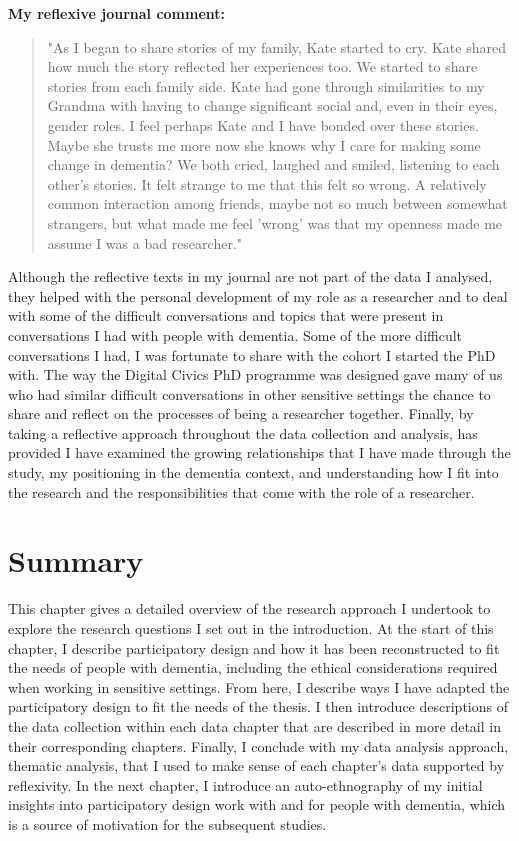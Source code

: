 \textbf{My reflexive journal comment: 
}
\begin{quote}
"As I began to share stories of my family, Kate started to cry. Kate shared how much the story reflected her experiences too. We started to share stories from each family side. Kate had gone through similarities to my Grandma with having to change significant social and, even in their eyes, gender roles. I feel perhaps Kate and I have bonded over these stories. Maybe she trusts me more now she knows why I care for making some change in dementia? We both cried, laughed and smiled, listening to each other's stories. It felt strange to me that this felt so wrong. A relatively common interaction among friends, maybe not so much between somewhat strangers, but what made me feel 'wrong' was that my openness made me assume I was a bad researcher."
\end{quote}

Although the reflective texts in my journal are not part of the data I analysed, they helped with the personal development of my role as a researcher and to deal with some of the difficult conversations and topics that were present in conversations I had with people with dementia. Some of the more difficult conversations I had, I was fortunate to share with the cohort I started the PhD with. The way the Digital Civics PhD programme was designed gave many of us who had similar difficult conversations in other sensitive settings the chance to share and reflect on the processes of being a researcher together. Finally, by taking a reflective approach throughout the data collection and analysis, has provided I have examined the growing relationships that I have made through the study, my positioning in the dementia context, and understanding how I fit into the research and the responsibilities that come with the role of a researcher. 

\section{Summary}
\label{Method:summary}
This chapter gives a detailed overview of the research approach I undertook to explore the research questions I set out in the introduction. At the start of this chapter, I describe participatory design and how it has been reconstructed to fit the needs of people with dementia, including the ethical considerations required when working in sensitive settings. From here, I describe ways I have adapted the participatory design to fit the needs of the thesis. I then introduce descriptions of the data collection within each data chapter that are described in more detail in their corresponding chapters. Finally, I conclude with my data analysis approach, thematic analysis, that I used to make sense of each chapter's data supported by reflexivity. In the next chapter, I introduce an auto-ethnography of my initial insights into participatory design work with and for people with dementia, which is a source of motivation for the subsequent studies.
